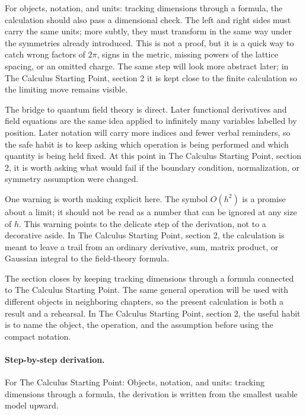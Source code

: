 For objects, notation, and units: tracking dimensions through a formula, the calculation should also pass a dimensional check.  The left and right sides must carry the same units; more subtly, they must transform in the same way under the symmetries already introduced.  This is not a proof, but it is a quick way to catch wrong factors of \(2\pi\), signs in the metric, missing powers of the lattice spacing, or an omitted charge.  The same step will look more abstract later; in The Calculus Starting Point, section 2 it is kept close to the finite calculation so the limiting move remains visible.

The bridge to quantum field theory is direct.  Later functional derivatives and field equations are the same idea applied to infinitely many variables labelled by position.  Later notation will carry more indices and fewer verbal reminders, so the safe habit is to keep asking which operation is being performed and which quantity is being held fixed.  At this point in The Calculus Starting Point, section 2, it is worth asking what would fail if the boundary condition, normalization, or symmetry assumption were changed.

One warning is worth making explicit here.  The symbol \(O(h^2)\) is a promise about a limit; it should not be read as a number that can be ignored at any size of \(h\).  This warning points to the delicate step of the derivation, not to a decorative aside.  In The Calculus Starting Point, section 2, the calculation is meant to leave a trail from an ordinary derivative, sum, matrix product, or Gaussian integral to the field-theory formula.

The section closes by keeping tracking dimensions through a formula connected to The Calculus Starting Point.  The same general operation will be used with different objects in neighboring chapters, so the present calculation is both a result and a rehearsal.  In The Calculus Starting Point, section 2, the useful habit is to name the object, the operation, and the assumption before using the compact notation.



\paragraph{Step-by-step derivation.}

For The Calculus Starting Point: Objects, notation, and units: tracking dimensions through a formula, the derivation is written from the smallest usable model upward.

